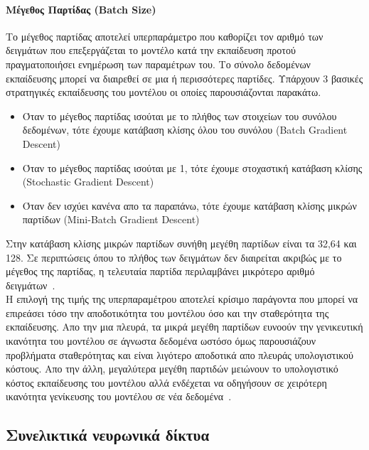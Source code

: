 \documentclass[12pt]{article}
\numberwithin{equation}{section}
\begin{document}
\paragraph{Μέγεθος Παρτίδας (Batch Size)\\ [0.5 cm]}

Το μέγεθος παρτίδας αποτελεί υπερπαράμετρο που καθορίζει τον αριθμό των δειγμάτων που επεξεργάζεται το μοντέλο κατά την εκπαίδευση προτού πραγματοποιήσει ενημέρωση των παραμέτρων του. Το σύνολο δεδομένων εκπαίδευσης μπορεί να διαιρεθεί σε μια ή περισσότερες παρτίδες. Υπάρχουν 3 βασικές στρατηγικές εκπαίδευσης του μοντέλου οι οποίες παρουσιάζονται παρακάτω.\\


\begin{itemize}
    \item Όταν το μέγεθος παρτίδας ισούται με το πλήθος των στοιχείων του συνόλου δεδομένων, τότε έχουμε κατάβαση κλίσης όλου του συνόλου (Batch Gradient Descent)
    \item Όταν το μέγεθος παρτίδας ισούται με 1, τότε έχουμε στοχαστική κατάβαση κλίσης (Stochastic Gradient Descent)
    \item Όταν δεν ισχύει κανένα απο τα παραπάνω, τότε έχουμε κατάβαση κλίσης μικρών παρτίδων (Mini-Batch Gradient Descent)
\end{itemize}

Στην κατάβαση κλίσης μικρών παρτίδων συνήθη μεγέθη παρτίδων είναι τα 32,64 και 128. Σε περιπτώσεις όπου το πλήθος των δειγμάτων δεν διαιρείται ακριβώς με το μέγεθος της παρτίδας, η τελευταία παρτίδα περιλαμβάνει μικρότερο αριθμό δειγμάτων~\cite{brownlee2018difference}.\\

Η επιλογή της τιμής της υπερπαραμέτρου αποτελεί κρίσιμο παράγοντα που μπορεί να επιρεάσει τόσο την αποδοτικότητα του μοντέλου όσο και την σταθερότητα της εκπαίδευσης. Απο την μια πλευρά, τα μικρά μεγέθη παρτίδων ευνοούν την γενικευτική ικανότητα του μοντέλου σε άγνωστα δεδομένα ωστόσο όμως παρουσιάζουν προβλήματα σταθερότητας και είναι λιγότερο αποδοτικά απο πλευράς υπολογιστικού κόστους. Απο την άλλη, μεγαλύτερα μεγέθη παρτιδών μειώνουν το υπολογιστικό κόστος εκπαίδευσης του μοντέλου αλλά ενδέχεται να οδηγήσουν σε χειρότερη ικανότητα γενίκευσης του μοντέλου σε νέα δεδομένα~\cite{article3}.\\
 

\subsection{Συνελικτικά νευρωνικά δίκτυα}
\end{document}
